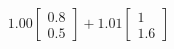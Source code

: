 \documentclass[preview]{standalone}
\begin{document}
\begin{align*}
1.00 \begin{bmatrix} 0.8 \\ 0.5 \end{bmatrix} + 1.01 \begin{bmatrix} 1 \\ 1.6 \end{bmatrix}
\end{align*}
\end{document}
